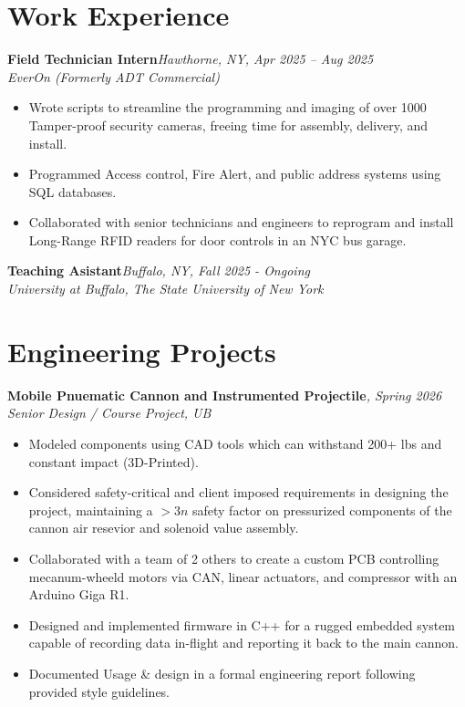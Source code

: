 \documentclass[10pt, letterpaper]{article}
\newcommand{\entry}[4]{%
  \noindent
  \textbf{#1}\hfill\textit{#3, #4}\\
  \textit{#2}
  \vspace{2pt}
}
\begin{document}
\vspace{2pt}

\section{Work Experience}

\entry
{Field Technician Intern}
{EverOn (Formerly ADT Commercial)}
{Hawthorne, NY}
{Apr 2025 -- Aug 2025}
\begin{itemize}
	\item Wrote scripts to streamline the programming and imaging of over 1000 Tamper-proof security cameras, freeing time for assembly, delivery, and install.
	\item Programmed Access control, Fire Alert, and public address systems using SQL databases.
	\item Collaborated with senior technicians and engineers to reprogram and install Long-Range RFID readers for door controls in an NYC bus garage.
\end{itemize}

\entry
{Teaching Asistant}
{University at Buffalo, The State University of New York}
{Buffalo, NY}
{Fall 2025 - Ongoing}

\vspace{4pt}

\section{Engineering Projects}

\entry
{Mobile Pnuematic Cannon and Instrumented Projectile}
{Senior Design / Course Project, UB}
{}
{Spring 2026}
\begin{itemize}
	\item Modeled components using CAD tools which can withstand 200+ lbs and constant impact (3D-Printed).
	\item Considered safety-critical and client imposed requirements in designing the project, maintaining a $>3n$ safety factor on pressurized components of the cannon air resevior and solenoid value assembly.
	\item Collaborated with a team of 2 others to create a custom PCB controlling mecanum-wheeld motors via CAN, linear actuators, and compressor with an Arduino Giga R1.
	\item Designed and implemented firmware in C++ for a rugged embedded system capable of recording data in-flight and reporting it back to the main cannon.
	\item Documented Usage \& design in a formal engineering report following provided style guidelines.
\end{itemize}
\end{document}
